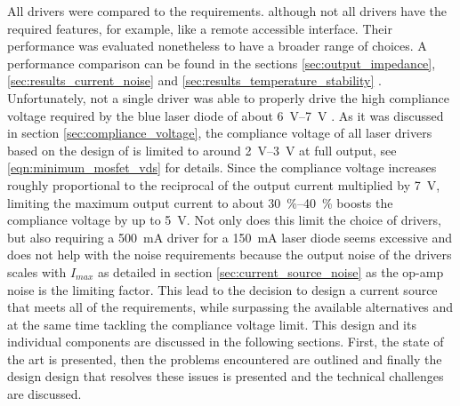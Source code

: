 All drivers were compared to the requirements. although not all drivers have the required features, for example, like a remote accessible interface. Their performance was evaluated nonetheless to have a broader range of choices. A performance comparison can be found in the sections \ref{sec:output_impedance}, \ref{sec:results_current_noise} and \ref{sec:results_temperature_stability} . Unfortunately, not a single driver was able to properly drive the high compliance voltage required by the blue laser diode  \cite{datasheet_osram_pl450b} of about \qtyrange[range-units = single,range-phrase=\textup{~to~}]{6}{7}{\V} \cite{datasheet_osram_pl450b}. As it was discussed in section \ref{sec:compliance_voltage}, the compliance voltage of all laser drivers based on the design of \citeauthor{libbrecht_hall} \cite{libbrecht_hall} is limited to around \qtyrange[range-units = single,range-phrase=\textup{~to~}]{2}{3}{\V} at full output, see \ref{eqn:minimum_mosfet_vds} for details. Since the compliance voltage increases roughly proportional to the reciprocal of the output current multiplied by \qty{7}{\V}, limiting the maximum output current to about \qtyrange[range-units = single]{30}{40}{\percent} boosts the compliance voltage by up to \qty{5}{\V}. Not only does this limit the choice of drivers, but also requiring a \qty{500}{\mA} driver for a \qty{150}{\mA} laser diode seems excessive and does not help with the noise requirements because the output noise of the drivers scales with $I_{max}$ as detailed in section \ref{sec:current_source_noise} as the op-amp noise is the limiting factor. This lead to the decision to design a current source that meets all of the requirements, while surpassing the available alternatives and at the same time tackling the compliance voltage limit. This design and its individual components are discussed in the following sections. First, the state of the art is presented, then the problems encountered are outlined and finally the design design that resolves these issues is presented and the technical challenges are discussed.


